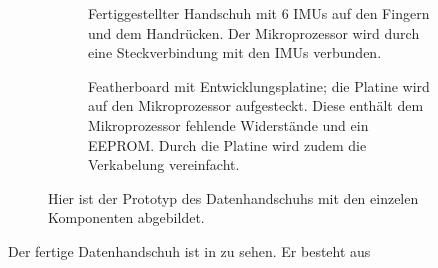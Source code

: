 \begin{figure}[htb]
    \begin{subfigure}[t]{0.59\textwidth}
        \centering
        \caption{Fertiggestellter Handschuh mit 6 IMUs auf den Fingern und dem Handrücken. Der Mikroprozessor wird durch eine Steckverbindung mit den IMUs verbunden.}
    \end{subfigure}
    \hfill
    \begin{subfigure}[t]{0.4\textwidth}
        \centering
        \caption{Featherboard mit Entwicklungsplatine; die Platine wird auf den Mikroprozessor aufgesteckt. Diese enthält dem Mikroprozessor fehlende Widerstände und ein EEPROM. Durch die Platine wird zudem die Verkabelung vereinfacht.}
    \end{subfigure}

    \caption[Prototyp des Datenhandschuhs mit den einzelnen Komponenten]{Hier ist der Prototyp des Datenhandschuhs mit den einzelen Komponenten abgebildet.}
\end{figure}

Der fertige Datenhandschuh ist in  zu sehen. Er besteht aus

